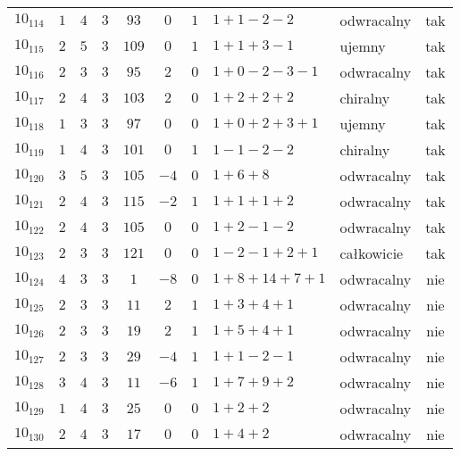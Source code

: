 \begin{longtable}{lccccccllc}
$10_{114}$  &  $1$     &  $4$  &  $3$      &  $93$   &  $0$   &  $1$  &  $1+1-2-2$      &  odwracalny  &  tak  \\
$10_{115}$  &  $2$     &  $5$  &  $3$      &  $109$  &  $0$   &  $1$  &  $1+1+3-1$      &  ujemny      &  tak  \\
$10_{116}$  &  $2$     &  $3$  &  $3$      &  $95$   &  $2$   &  $0$  &  $1+0-2-3-1$    &  odwracalny  &  tak  \\
$10_{117}$  &  $2$     &  $4$  &  $3$      &  $103$  &  $2$   &  $0$  &  $1+2+2+2$      &  chiralny    &  tak  \\
$10_{118}$  &  $1$     &  $3$  &  $3$      &  $97$   &  $0$   &  $0$  &  $1+0+2+3+1$    &  ujemny      &  tak  \\
$10_{119}$  &  $1$     &  $4$  &  $3$      &  $101$  &  $0$   &  $1$  &  $1-1-2-2$      &  chiralny    &  tak  \\
$10_{120}$  &  $3$     &  $5$  &  $3$      &  $105$  &  $-4$  &  $0$  &  $1+6+8$        &  odwracalny  &  tak  \\
$10_{121}$  &  $2$     &  $4$  &  $3$      &  $115$  &  $-2$  &  $1$  &  $1+1+1+2$      &  odwracalny  &  tak  \\
$10_{122}$  &  $2$     &  $4$  &  $3$      &  $105$  &  $0$   &  $0$  &  $1+2-1-2$      &  odwracalny  &  tak  \\
$10_{123}$  &  $2$     &  $3$  &  $3$      &  $121$  &  $0$   &  $0$  &  $1-2-1+2+1$    &  całkowicie  &  tak  \\
$10_{124}$  &  $4$     &  $3$  &  $3$      &  $1$    &  $-8$  &  $0$  &  $1+8+14+7+1$   &  odwracalny  &  nie  \\
$10_{125}$  &  $2$     &  $3$  &  $3$      &  $11$   &  $2$   &  $1$  &  $1+3+4+1$      &  odwracalny  &  nie  \\
$10_{126}$  &  $2$     &  $3$  &  $3$      &  $19$   &  $2$   &  $1$  &  $1+5+4+1$      &  odwracalny  &  nie  \\
$10_{127}$  &  $2$     &  $3$  &  $3$      &  $29$   &  $-4$  &  $1$  &  $1+1-2-1$      &  odwracalny  &  nie  \\
$10_{128}$  &  $3$     &  $4$  &  $3$      &  $11$   &  $-6$  &  $1$  &  $1+7+9+2$      &  odwracalny  &  nie  \\
$10_{129}$  &  $1$     &  $4$  &  $3$      &  $25$   &  $0$   &  $0$  &  $1+2+2$        &  odwracalny  &  nie  \\
$10_{130}$  &  $2$     &  $4$  &  $3$      &  $17$   &  $0$   &  $0$  &  $1+4+2$        &  odwracalny  &  nie  \\

\end{longtable}

